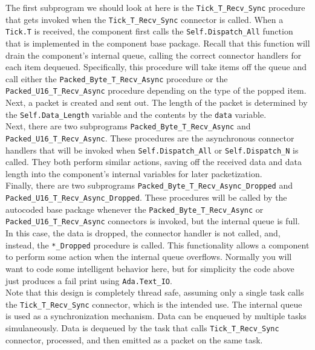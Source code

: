 The first subprogram we should look at here is the \texttt{Tick\_T\_Recv\_Sync} procedure that gets invoked when the \texttt{Tick\_T\_Recv\_Sync} connector is called. When a \texttt{Tick.T} is received, the component first calls the \texttt{Self.Dispatch\_All} function that is implemented in the component base package. Recall that this function will drain the component's internal queue, calling the correct connector handlers for each item dequeued. Specifically, this procedure will take items off the queue and call either the \texttt{Packed\_Byte\_T\_Recv\_Async} procedure or the \texttt{Packed\_U16\_T\_Recv\_Async} procedure depending on the type of the popped item. Next, a packet is created and sent out. The length of the packet is determined by the \texttt{Self.Data\_Length} variable and the contents by the \texttt{data} variable. \\

Next, there are two subprograms \texttt{Packed\_Byte\_T\_Recv\_Async} and \texttt{Packed\_U16\_T\_Recv\_Async}. These procedures are the asynchronous connector handlers that will be invoked when \texttt{Self.Dispatch\_All} or \texttt{Self.Dispatch\_N} is called. They both perform similar actions, saving off the received data and data length into the component's internal variables for later packetization. \\

Finally, there are two subprograms \texttt{Packed\_Byte\_T\_Recv\_Async\_Dropped} and \texttt{Packed\_U16\_T\_Recv\_Async\_Dropped}. These procedures will be called by the autocoded base package whenever the \texttt{Packed\_Byte\_T\_Recv\_Async} or \texttt{Packed\_U16\_T\_Recv\_Async} connectors is invoked, but the internal queue is full. In this case, the data is dropped, the connector handler is not called, and, instead, the \texttt{*\_Dropped} procedure is called. This functionality allows a component to perform some action when the internal queue overflows. Normally you will want to code some intelligent behavior here, but for simplicity the code above just produces a fail print using \texttt{Ada.Text\_IO}. \\

Note that this design is completely thread safe, assuming only a single task calls the \texttt{Tick\_T\_Recv\_Sync} connector, which is the intended use. The internal queue is used as a synchronization mechanism. Data can be enqueued by multiple tasks simulaneously. Data is dequeued by the task that calls \texttt{Tick\_T\_Recv\_Sync} connector, processed, and then emitted as a packet on the same task. \\

